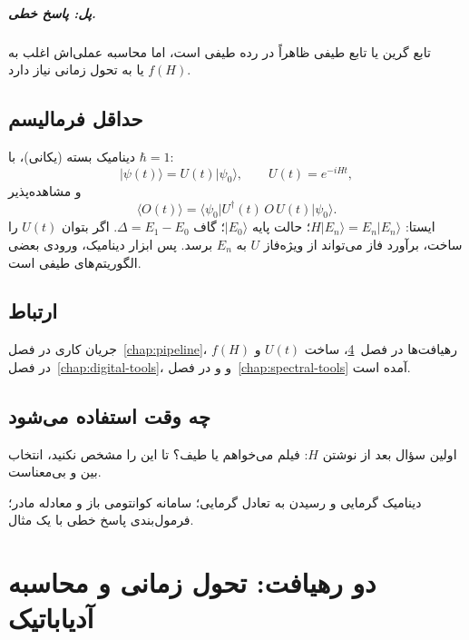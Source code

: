 \paragraph{پل: پاسخ خطی.}
تابع گرین یا تابع طیفی ظاهراً در رده طیفی است، اما محاسبه عملی‌اش اغلب به $f(H)$ یا به تحول زمانی نیاز دارد.

\section{حداقل فرمالیسم}

دینامیک بسته (یکانی)، با $\hbar=1$:
\begin{equation}
	\lvert\psi(t)\rangle = U(t)\lvert\psi_0\rangle,\qquad U(t)=e^{-iHt},
\end{equation}
و مشاهده‌پذیر
\begin{equation}
	\langle O(t)\rangle = \langle\psi_0\rvert U^\dagger(t)\,O\,U(t)\lvert\psi_0\rangle.
\end{equation}
ایستا: $H\lvert E_n\rangle = E_n\lvert E_n\rangle$؛ حالت پایه $\lvert E_0\rangle$؛ گاف $\Delta = E_1-E_0$. اگر بتوان $U(t)$ را ساخت، برآورد فاز می‌تواند از ویژه‌فاز $U$ به $E_n$ برسد. پس ابزار دینامیک، ورودی بعضی الگوریتم‌های طیفی است.

\section{ارتباط}

جریان کاری در فصل~\ref{chap:pipeline}، رهیافت‌ها در فصل~\ref{chap:evo-adi}، ساخت $U(t)$ و $f(H)$ در فصل~\ref{chap:digital-tools}، و  و  در فصل~\ref{chap:spectral-tools} آمده است.

\section{چه وقت استفاده می‌شود}

اولین سؤال بعد از نوشتن $H$: فیلم می‌خواهم یا طیف؟ تا این را مشخص نکنید، انتخاب بین  و  بی‌معناست.

\begin{remark}
	دینامیک گرمایی و رسیدن به تعادل گرمایی؛ سامانه کوانتومی باز و معادله مادر؛ فرمول‌بندی پاسخ خطی با یک مثال.
\end{remark}

\chapter{دو رهیافت: تحول زمانی و محاسبه آدیاباتیک}
\label{chap:evo-adi}

